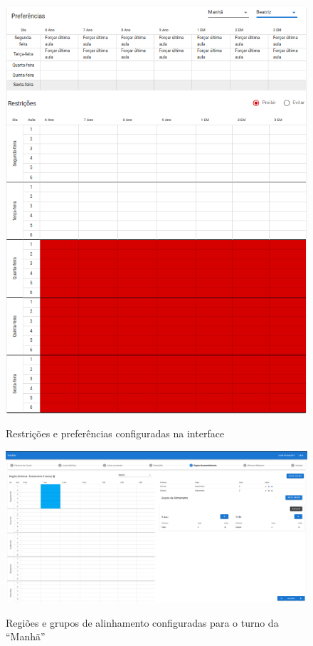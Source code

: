 \begin{figure}[p]
	\centering
	\caption{Restrições e preferências configuradas na interface}
	\includegraphics[width=1\textwidth]{./dados/figuras/restricoes_configuradas}
	\label{fig:restricoes_configuradas}
\end{figure}

\begin{figure}[p]
	\centering
	\caption{Regiões e grupos de alinhamento configuradas para o turno da ``Manhã''}
	\includegraphics[width=1\textwidth]{./dados/figuras/regioes_configuradas_manha}
	\label{fig:regioes_configuradas_manha}
\end{figure}

